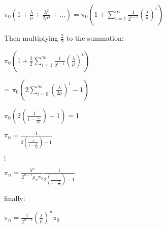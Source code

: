 \documentclass[]{article}
\begin{document}
\(\pi_0 (1 + \frac{\lambda}{\mu} + \frac{\lambda^2}{2 \mu^2} + \dots) = \pi_0 (1 + \sum_{i=1}^{\infty} \frac{1}{2^{i-1}} (\frac{\lambda}{\mu})^{i})\)

Then multiplying \(\frac{2}{2}\) to the summation:

\(\pi_0 (1 + \frac{2}{2} \sum_{i=1}^{\infty} \frac{1}{2^{i-1}} (\frac{\lambda}{\mu})^{i})\)

= \(\pi_0 (2 \sum_{i=0}^{\infty} (\frac{\lambda}{2 \mu})^{i} - 1)\)

\(\pi_0 (2 (\frac{1}{1 - \frac{\lambda}{2 \mu}}) - 1) = 1\)

\(\pi_0 = \frac{1}{2 (\frac{1}{1 - \frac{\lambda}{2 \mu}}) - 1}\)

\(\vdots\)

\(\pi_n = \frac{\lambda^n}{2^{n-1}{\mu_n} \pi_0} \frac{1}{2 (\frac{1}{1 - \frac{\lambda}{2 \mu}}) - 1}\)

finally:

\(\pi_n = \frac{1}{2^{n-1}} (\frac{\lambda}{\mu})^{n} \pi_0\)
\end{document}
